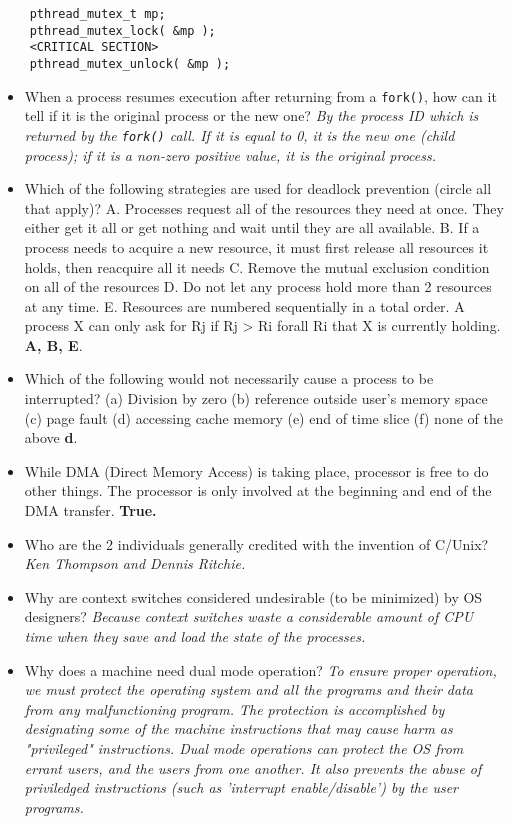 \documentclass[10pt,landscape]{article}
\begin{document}
\begin{multicols}{4}
\begin{verbatim}
    pthread_mutex_t mp;
    pthread_mutex_lock( &mp );
    <CRITICAL SECTION>
    pthread_mutex_unlock( &mp );
\end{verbatim}

\begin{itemize}
    \item When a process resumes execution after returning from a \verb$fork()$, how can it tell if it is the original process or the new one? \textit{By the process ID which is returned by the \texttt{fork()} call. If it is equal to 0, it is the new one (child process); if it is a non-zero positive value, it is the original process.}
    \item Which of the following strategies are used for deadlock prevention (circle all that apply)?  A. Processes request all of the resources they need at once.  They either get it all or get nothing and wait until they are all available.  B. If a process needs to acquire a new resource, it must first release all resources it holds, then reacquire all it needs C. Remove the mutual exclusion condition on all of the resources D. Do not let any process hold more than 2 resources at any time.  E. Resources are numbered sequentially in a total order. A process X can only ask for Rj if Rj > Ri  forall Ri that X is currently holding.  \textbf{A, B, E}.
    \item Which of the following would not necessarily cause a process to be interrupted? (a) Division by zero (b) reference outside user's memory space (c) page fault (d) accessing cache memory (e) end of time slice (f) none of the above \textbf{d}.
    \item While DMA (Direct Memory Access) is taking place, processor is free to do other things. The processor is only involved at the beginning and end of the DMA transfer.  \textbf{True.}
    \item Who are the 2 individuals generally credited with the invention of C/Unix?  \textit{Ken Thompson and Dennis Ritchie.}
    \item Why are context switches considered undesirable (to be minimized) by OS designers?  \textit{Because context switches waste a considerable amount of CPU time when they save and load the state of the processes.}
    \item Why does a machine need dual mode operation? \textit{To ensure proper operation, we must protect the operating system and all the programs and their data from any malfunctioning program.  The protection is accomplished by designating some of the machine instructions that may cause harm as "privileged" instructions.  Dual mode operations can protect the OS from errant users, and the users from one another.  It also prevents the abuse of priviledged instructions (such as 'interrupt enable/disable') by the user programs.}

\end{itemize}
\end{multicols}
\end{document}
